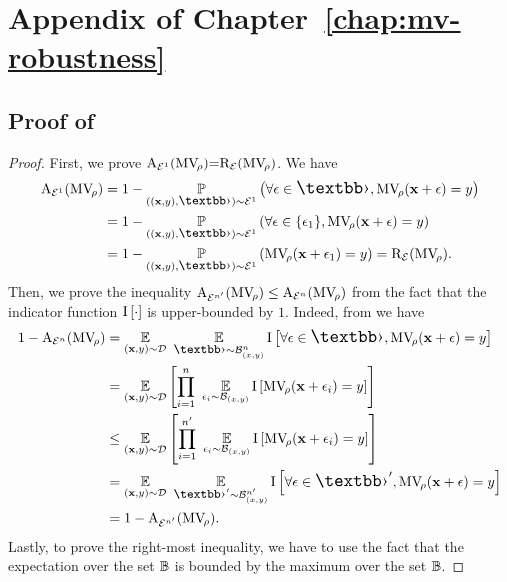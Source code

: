 \chapter{Appendix of Chapter~\ref{chap:mv-robustness}}
\label{ap:mv-robustness}

\minitoc

\begin{noaddcontents}
\section{Proof of }
\label{ap:mv-robustness:sec:proof-risks}

\proprisks*
\begin{proof} First, we prove $\text{A}_{{\mathcal{E}}^{1}}(\text{MV}_{\!\rho}){=}\text{R}_{{\mathcal{E}}}(\text{MV}_{\!\rho})$. We have
\begin{align*}
    \RiskM_{\Dpert^{1}}(\MVQ) &= 1- \PP_{((\x,\y), \Epert)\sim\Dpert^{1}} \LP \forall \epsilon\in\Epert, \MVQ(\x+\epsilon) = \y \RP\\
    &= 1- \PP_{((\x,\y), \Epert)\sim\Dpert^{1}} \LP \forall \epsilon\in\{\epsilon_1\}, \MVQ(\x+\epsilon) = \y \RP\\
    &= 1- \PP_{((\x,\y), \Epert)\sim\Dpert^{1}} \LP \MVQ(\x+\epsilon_1) = \y \RP = \Risk_{\Dpert}(\MVQ).
\end{align*}
Then, we prove the inequality $\text{A}_{{\mathcal{E}}^{n'}}(\text{MV}_{\!\rho}) \le \text{A}_{{\mathcal{E}}^{n}}(\text{MV}_{\!\rho})$ from the fact that the indicator function $\operatorname{I}\left[\cdot\right]$ is upper-bounded by $1$. Indeed, from  we have 
\allowdisplaybreaks
\begin{align*}
    1-\RiskM_{\Dpert^{n}}(\MVQ) &= \EE_{(\x,\y)\sim\D} \ \EE_{\Epert\sim\DX^{n}} \indic\LB\forall\epsilon\in\Epert, \MVQ(\x+\epsilon) = \y\RB\\
    &= \EE_{(\x,\y)\sim\D}\LB \prod_{i=1}^{{n}}\ \EE_{\epsilon_i\sim\DX}\indic\LB\MVQ(\x+\epsilon_i) = \y\RB\RB\\
    &\le \EE_{(\x,\y)\sim\D}\LB \prod_{i=1}^{{n'}}\ \EE_{\epsilon_i\sim\DX}\indic\LB\MVQ(\x+\epsilon_i) = \y\RB\RB\\
    &= \EE_{(\x,\y)\sim\D}\ \EE_{\Epert'\sim\DX^{n'}} \indic\LB\forall\epsilon\in\Epert', \MVQ(\x+\epsilon) = \y\RB\\
    &= 1-\RiskM_{\Dpert^{n'}}(\MVQ).
\end{align*}
Lastly, to prove the right-most inequality, we have to use the fact that the expectation over the set $\mathbb{B}$ is bounded by the maximum over the set $\mathbb{B}$.  

\end{proof}
\end{noaddcontents}
